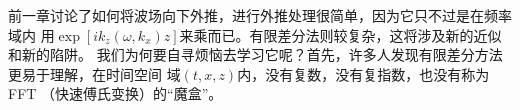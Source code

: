 前一章讨论了如何将波场向下外推，进行外推处理很简单，因为它只不过是在频率域内
用$\exp[ik_z(\omega,k_x)z]$来乘而已。有限差分法则较复杂，这将涉及新的近似和新的陷阱。
我们为何要自寻烦恼去学习它呢？首先，许多人发现有限差分方法更易于理解，在时间空间
域$(t,x,z)$内，没有复数，没有复指数，也没有称为FFT
（快速傅氏变换）的“魔盒”。
